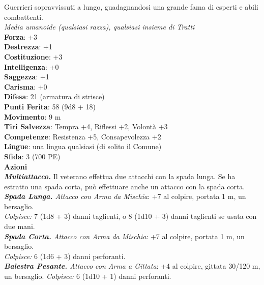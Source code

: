 \begin{multicols}{2}
Guerrieri sopravvissuti a lungo, guadagnandosi una grande fama di esperti e abili combattenti.\\
\emph{Media umanoide (qualsiasi razza), qualsiasi insieme di Tratti}\\
\textbf{Forza}: +3\\
\textbf{Destrezza}: +1\\
\textbf{Costituzione}: +3\\
\textbf{Intelligenza}: +0\\
\textbf{Saggezza}: +1\\
\textbf{Carisma}: +0\\
\textbf{Difesa}: 21 (armatura di strisce)\\
\textbf{Punti Ferita}: 58 (9d8 + 18)\\
\textbf{Movimento}: 9 m\\
\textbf{Tiri Salvezza}: Tempra +4, Riflessi +2, Volontà +3 \\
\textbf{Competenze}: Resistenza +5, Consapevolezza +2\\
\textbf{Lingue}: una lingua qualsiasi (di solito il Comune)\\
\textbf{Sfida}: 3 (700 PE)\smallskip\\
\smallskip\textbf{Azioni}\\
\emph{\textbf{Multiattacco.}} Il veterano effettua due attacchi con la spada lunga. Se ha estratto una spada corta, può effettuare anche un attacco con la spada corta.
\emph{\textbf{Spada Lunga.} Attacco con Arma da Mischia}: +7 al colpire, portata 1 m, un bersaglio.\\
\emph{Colpisce:} 7 (1d8 + 3) danni taglienti, o 8 (1d10 + 3) danni taglienti se usata con due mani.\\
\emph{\textbf{Spada Corta.} Attacco con Arma da Mischia}: +7 al colpire, portata 1 m, un bersaglio.\\
\emph{Colpisce:} 6 (1d6 + 3) danni perforanti.\\
\emph{\textbf{Balestra Pesante.} Attacco con Arma a Gittata}: +4 al colpire, gittata 30/120 m, un bersaglio. \emph{Colpisce:} 6 (1d10 + 1) danni perforanti.\\


\end{multicols}
